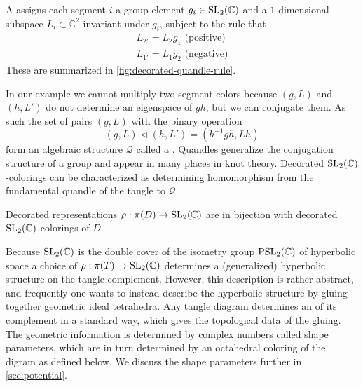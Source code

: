 \documentclass[leqno]{sl2art}
\begin{document}
\begin{definition}
  A  assigns each segment \(i\) a group element \(g_i \in \operatorname{SL}_2(\mathbb{C})\) and a \(1\)-dimensional subspace \(L_i \subset \mathbb{C}^{2}\) invariant under \(g_i\), subject to the rule that
  \begin{gather}
    \label{eq:decorated-positive}
    L_{2'} = L_2 g_1  \text{ (positive)}
    \\
    \label{eq:decorated-negative}
    L_{1'} = L_{1} g_{2} \text{ (negative)}
  \end{gather}
  These are summarized in \cref{fig:decorated-quandle-rule}.
\end{definition}

In our example we cannot multiply two segment colors because \((g, L)\) and \((h, L')\) do not determine an eigenspace of \(gh\), but we can conjugate them.
As such the set of pairs  \((g, L)\) with the binary operation
\[
  (g, L) \triangleleft (h, L') = (h^{-1} g h, L h)
\]
form an algebraic structure \(\mathcal{Q}\) called a .
Quandles generalize the conjugation structure of a group and appear in many places in knot theory.
Decorated \(\operatorname{SL}_2(\mathbb{C})\)-colorings can be characterized as determining homomorphism from the fundamental quandle of the tangle to \(\mathcal{Q}\).

\begin{proposition}
  Decorated representations \(\rho : \pi(D) \to \operatorname{SL}_2(\mathbb{C})\) are in bijection with decorated \(\operatorname{SL}_2(\mathbb{C})\)-colorings of \(D\).
\end{proposition}

Because \(\operatorname{SL}_2(\mathbb{C})\)  is the double cover of the isometry group \(\operatorname{PSL}_2(\mathbb{C})\) of hyperbolic space a choice of \(\rho : \pi(T) \to \operatorname{SL}_2(\mathbb{C})\) determines a (generalized) hyperbolic structure on the tangle complement.
However, this description is rather abstract, and frequently one wants to instead describe the hyperbolic structure by gluing together geometric ideal tetrahedra.
Any tangle diagram determines an  \cite{Kim2016,McPhailSnyder2022} of its complement in a standard way, which gives the topological data of the gluing.
The geometric information is determined by complex numbers called shape parameters, which are in turn determined by an octahedral coloring of the digram as defined below.
We discuss the shape parameters further in \cref{sec:potential}.
\end{document}
